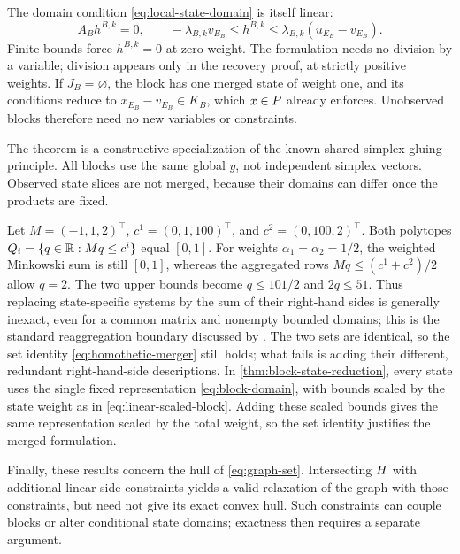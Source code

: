 The domain condition \eqref{eq:local-state-domain} is itself linear:
\begin{equation}\label{eq:linear-scaled-block}
 A_Bh^{B,k}=0,\qquad
 -\lambda_{B,k}v_{E_B}\le h^{B,k}
       \le\lambda_{B,k}(u_{E_B}-v_{E_B}).
\end{equation}
Finite bounds force $h^{B,k}=0$ at zero weight. The formulation needs no
division by a variable; division appears only in the recovery proof, at
strictly positive weights. If $J_B=\varnothing$, the block has one merged
state of weight one, and its conditions reduce to $x_{E_B}-v_{E_B}\in K_B$,
which $x\in P$ already enforces. Unobserved blocks therefore need no new
variables or constraints.

The theorem is a constructive specialization of the known shared-simplex
gluing principle. All blocks use the same global $y$, not independent
simplex vectors. Observed state slices are not merged, because their
domains can differ once the products are fixed.

\begin{example}\label{ex:merger-boundary}
Let $M=(-1,1,2)^\top$, $c^1=(0,1,100)^\top$, and
$c^2=(0,100,2)^\top$. Both polytopes
$Q_i=\{q\in\mathbb R:Mq\le c^i\}$ equal $[0,1]$.
For weights $\alpha_1=\alpha_2=1/2$, the weighted Minkowski sum is still
$[0,1]$, whereas the aggregated rows
$Mq\le(c^1+c^2)/2$ allow $q=2$. The two upper bounds become
$q\le101/2$ and $2q\le51$. Thus replacing state-specific systems by
the sum of their right-hand sides is generally inexact, even for a common
matrix and nonempty bounded domains; this is the standard reaggregation
boundary discussed by \citet[Section~2, equation~(7)]{KisHorvath2022}.
The two sets are identical, so the set identity
\eqref{eq:homothetic-merger} still holds; what fails is adding their
different, redundant right-hand-side descriptions. In
\cref{thm:block-state-reduction}, every state uses the single fixed
representation \eqref{eq:block-domain}, with bounds scaled by the state
weight as in \eqref{eq:linear-scaled-block}. Adding these scaled bounds gives
the same representation scaled by the total weight, so the set identity
justifies the merged formulation.
\end{example}

Finally, these results concern the hull of \eqref{eq:graph-set}. Intersecting
$H$ with additional linear side constraints yields a valid relaxation
of the graph with those constraints, but need not give its exact convex
hull. Such constraints can couple blocks or alter conditional state domains;
exactness then requires a separate argument.
